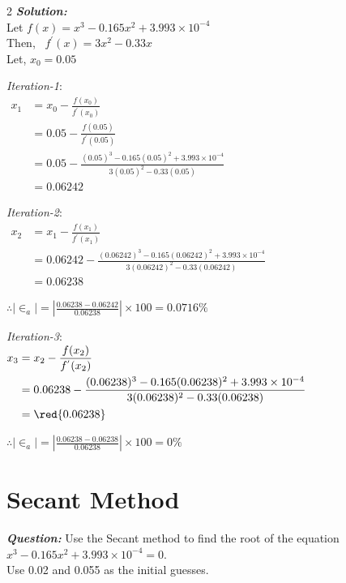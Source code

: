 \begin{multicols}{2}
\noindent
\raggedcolumns
\textbf{\textit{Solution:}}\\[0.5em]
Let $f(x) = x^3 - 0.165x^2 + 3.993 \times 10^{-4}$\\[0.5em]
Then, \ $f^{'}(x) = 3x^2 - 0.33x$\\[0.5em]
Let, $x_0 = 0.05$

\textit{Iteration-1}:\\[0.5em]
$\begin{aligned}
   x_{1} &= x_0 - \frac{f(x_0)}{f^{'}(x_0)} \\
   &= 0.05 - \frac{f(0.05)}{f^{'}(0.05)} \\
   &= 0.05 - \frac{(0.05)^3 - 0.165(0.05)^2 + 3.993 \times 10^{-4}}{3(0.05)^2 - 0.33(0.05)} \\
   &= 0.06242
\end{aligned}$

\columnbreak
\textit{Iteration-2}:\\[0.5em]
$\begin{aligned}
   x_{2} &= x_1 - \frac{f(x_1)}{f^{'}(x_1)} \\
   &= 0.06242 - \frac{(0.06242)^3 - 0.165(0.06242)^2 + 3.993 \times 10^{-4}}{3(0.06242)^2 - 0.33(0.06242)} \\
   &= 0.06238
\end{aligned}$

$\therefore |\in_a| = \left|\frac{0.06238 - 0.06242}{0.06238}\right| \times 100 = 0.0716\%$

\textit{Iteration-3}:\\[0.5em]
$\begin{aligned}
   x_{3} &= x_2 - \frac{f(x_2)}{f^{'}(x_2)} \\
   &= 0.06238 - \frac{(0.06238)^3 - 0.165(0.06238)^2 + 3.993 \times 10^{-4}}{3(0.06238)^2 - 0.33(0.06238)} \\
   &= \red{0.06238}
\end{aligned}$

$\therefore |\in_a| = \left|\frac{0.06238 - 0.06238}{0.06238}\right| \times 100 = 0\%$
\end{multicols}



\section*{Secant Method}
\textbf{\textit{Question:}}
Use the Secant method to find the root of the equation $x^3 - 0.165x^2 + 3.993 \times 10^{-4} = 0$.\\
Use 0.02 and 0.055 as the initial guesses.

